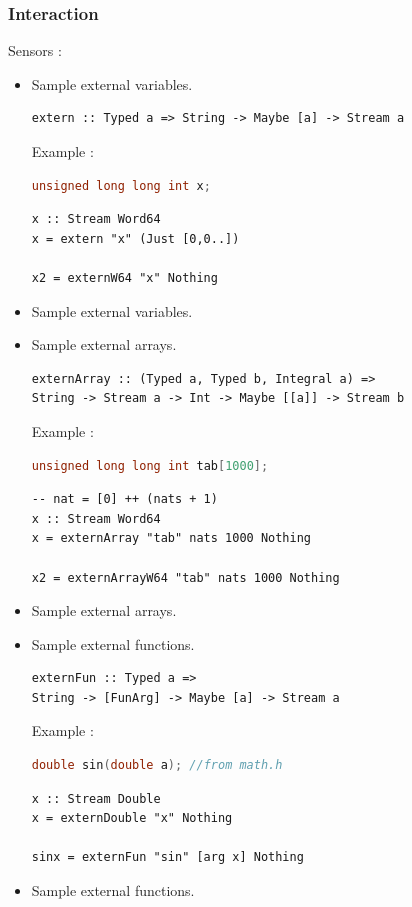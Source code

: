 \documentclass{beamer}
\begin{document}
\begin{frame}[fragile]
	\frametitle{Interaction}
	Sensors :
	\begin{itemize}
		\item<1|only@1> Sample external variables. 
\begin{verbatim}
extern :: Typed a => String -> Maybe [a] -> Stream a
\end{verbatim}
Example : 
\begin{lstlisting}[language=C]
unsigned long long int x;
\end{lstlisting}
\begin{verbatim}
x :: Stream Word64
x = extern "x" (Just [0,0..])

x2 = externW64 "x" Nothing
\end{verbatim}

		\item<2-4> Sample external variables. 
		\item<2|only@2> Sample external arrays. 
\begin{verbatim}
externArray :: (Typed a, Typed b, Integral a) => 
String -> Stream a -> Int -> Maybe [[a]] -> Stream b
\end{verbatim}
Example : 
\begin{lstlisting}[language=C]
unsigned long long int tab[1000];
\end{lstlisting}
\begin{verbatim}
-- nat = [0] ++ (nats + 1)
x :: Stream Word64
x = externArray "tab" nats 1000 Nothing

x2 = externArrayW64 "tab" nats 1000 Nothing
\end{verbatim}
	
		\item<3-4> Sample external arrays. 
		\item<3|only@3> Sample external functions. 

\begin{verbatim}
externFun :: Typed a => 
String -> [FunArg] -> Maybe [a] -> Stream a
\end{verbatim}
Example :
\begin{lstlisting}[language=C]
double sin(double a); //from math.h
\end{lstlisting}
\begin{verbatim}
x :: Stream Double
x = externDouble "x" Nothing

sinx = externFun "sin" [arg x] Nothing
\end{verbatim}
		
		\item<4> Sample external functions. 
	\end{itemize}
\end{frame}
  	
\end{document}
